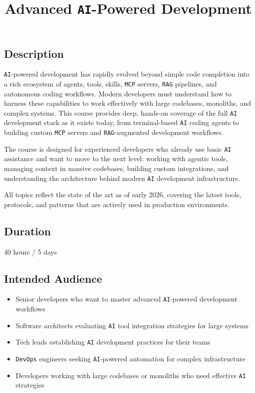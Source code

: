 \documentclass[
]{article}
\title{Advanced \texttt{AI}-Powered Development}
\author{}
\date{}
\providecommand{\tightlist}{%
  \setlength{\itemsep}{0pt}\setlength{\parskip}{0pt}}
\begin{document}
\maketitle

\subsection{Description}\label{description}

\texttt{AI}-powered development has rapidly evolved beyond simple code
completion into a rich ecosystem of agents, tools, skills, \texttt{MCP}
servers, \texttt{RAG} pipelines, and autonomous coding workflows. Modern
developers must understand how to harness these capabilities to work
effectively with large codebases, monoliths, and complex systems. This
course provides deep, hands-on coverage of the full \texttt{AI}
development stack as it exists today, from terminal-based \texttt{AI}
coding agents to building custom \texttt{MCP} servers and
\texttt{RAG}-augmented development workflows.

The course is designed for experienced developers who already use basic
\texttt{AI} assistance and want to move to the next level: working with
agentic tools, managing context in massive codebases, building custom
integrations, and understanding the architecture behind modern
\texttt{AI} development infrastructure.

All topics reflect the state of the art as of early 2026, covering the
latest tools, protocols, and patterns that are actively used in
production environments.

\subsection{Duration}\label{duration}

40 hours / 5 days

\subsection{Intended Audience}\label{intended-audience}

\begin{itemize}
\tightlist
\item
  Senior developers who want to master advanced \texttt{AI}-powered
  development workflows
\item
  Software architects evaluating \texttt{AI} tool integration strategies
  for large systems
\item
  Tech leads establishing \texttt{AI} development practices for their
  teams
\item
  \texttt{DevOps} engineers seeking \texttt{AI}-powered automation for
  complex infrastructure
\item
  Developers working with large codebases or monoliths who need
  effective \texttt{AI} strategies
\end{itemize}
\end{document}
